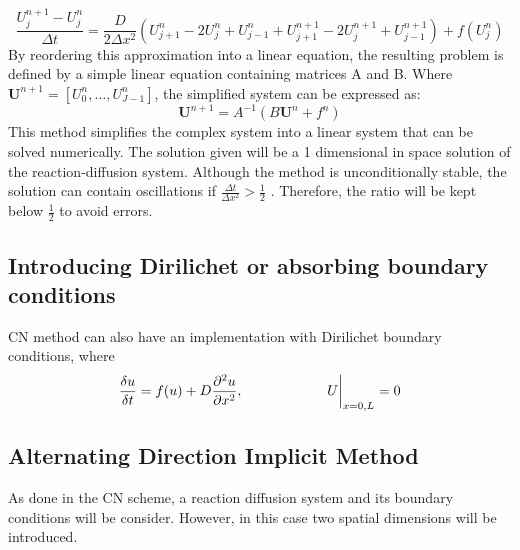 \begin{equation}
    \frac{U^{n+1}_{j} - U^{n}_{j}}{\Delta t} = \frac{D}{2\Delta x^{2}}\left( U^{n}_{j+1} -  2U^{n}_{j} + U^{n}_{j-1} + U^{n+1}_{j+1} - 2U^{n+1}_{j} + U^{n+1}_{j-1}\right) +  f( U^{n}_{j})
\end{equation}
By reordering this approximation into a linear equation, the resulting problem is defined by a simple linear equation containing matrices A and B. Where $\textbf{U}^{n+1} = [U^{n}_{0}, \ldots , U^{n}_{J-1}]$, the simplified system can be expressed as:
\begin{equation}
    \textbf{U}^{n+1} = A^{-1}(B\textbf{U}^{n} + f^{n})
\end{equation}
This method simplifies the complex system into a linear system that can be solved numerically. The solution given will be a 1 dimensional in space solution of the reaction-diffusion system. Although the method is  unconditionally stable, the solution can contain oscillations if $ \frac{\Delta t}{\Delta x^{2}} >\frac{1}{2} $ \parencite{trefethen1996finite}. Therefore, the ratio will be kept below $\frac{1}{2}$ to avoid errors.

\subsection{Introducing Dirilichet or absorbing boundary conditions}\label{methods_boundary_conditions}
CN method can also have an implementation with Dirilichet boundary conditions, where
\begin{equation}
    \frac{\delta u}{\delta t} =  f(u) + D\frac{\partial^{2} {u}}{\partial {x}^{2}},   \quad \quad \quad \quad \quad \quad U\biggr\rvert_{x=0,L}=0
\end{equation}
\subsection{Alternating Direction Implicit Method}\label{ADI}
As done in the \acrshort{CN} scheme, a reaction diffusion system and its boundary conditions will be consider. However, in this case two spatial dimensions will be introduced.

